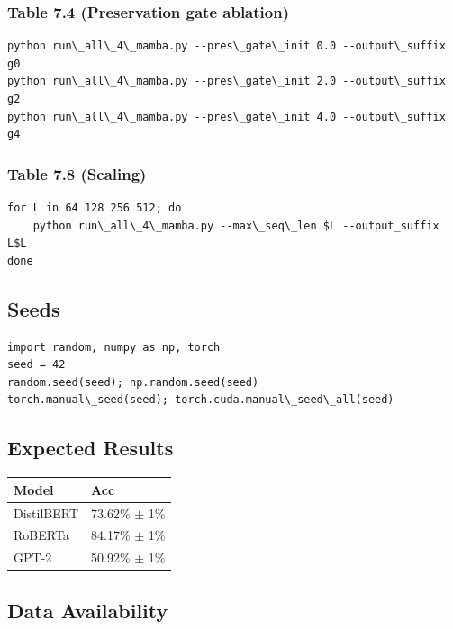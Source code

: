 \subsubsection{Table 7.4 (Preservation gate ablation)}
\begin{lstlisting}
python run\_all\_4\_mamba.py --pres\_gate\_init 0.0 --output\_suffix g0
python run\_all\_4\_mamba.py --pres\_gate\_init 2.0 --output\_suffix g2
python run\_all\_4\_mamba.py --pres\_gate\_init 4.0 --output\_suffix g4
\end{lstlisting}

\subsubsection{Table 7.8 (Scaling)}
\begin{lstlisting}
for L in 64 128 256 512; do
    python run\_all\_4\_mamba.py --max\_seq\_len $L --output_suffix L$L
done
\end{lstlisting}

\subsection{Seeds}

\begin{lstlisting}
import random, numpy as np, torch
seed = 42
random.seed(seed); np.random.seed(seed)
torch.manual\_seed(seed); torch.cuda.manual\_seed\_all(seed)
\end{lstlisting}

\subsection{Expected Results}

\begin{table}[H]
\centering
\small
\begin{tabular}{ll}
\toprule
\textbf{Model} & \textbf{Acc} \\
\midrule
DistilBERT & 73.62\% $\pm$ 1\% \\
RoBERTa & 84.17\% $\pm$ 1\% \\
GPT-2 & 50.92\% $\pm$ 1\% \\
\bottomrule
\end{tabular}
\end{table}

\subsection{Data Availability}


